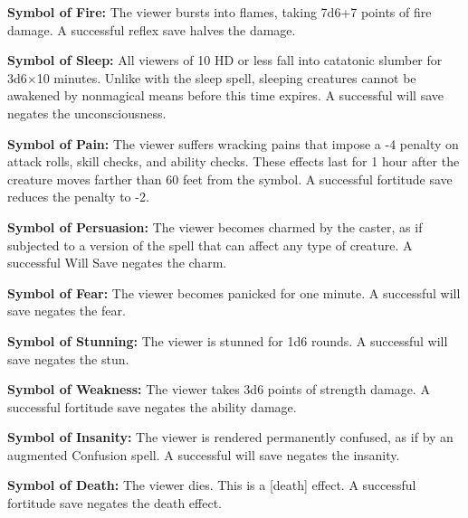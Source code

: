 \begin{list}{}{\leftmargin=1em}
 \item \textbf{Symbol of Fire:} The viewer bursts into flames, taking 7d6+7 points of fire damage.
 A successful reflex save halves the damage.
 \item \textbf{Symbol of Sleep:} All viewers of 10 HD or less fall into catatonic slumber for
 3d6$\times$10 minutes. Unlike with the sleep spell, sleeping creatures cannot be awakened by nonmagical means before this time expires.
 A successful will save negates the unconsciousness.
 \item \textbf{Symbol of Pain:} The viewer suffers wracking pains that impose a -4 penalty on attack rolls, 
 skill checks, and ability checks. These effects last for 1 hour after the creature moves farther than 60 feet from the symbol.
 A successful fortitude save reduces the penalty to -2.
 \item \textbf{Symbol of Persuasion:} The viewer becomes charmed by the caster, as if subjected to a version of the 
 spell that can affect any type of creature.
 A successful Will Save negates the charm.
 \item \textbf{Symbol of Fear:} The viewer becomes panicked for one minute. A successful will save negates the fear.
 \item \textbf{Symbol of Stunning:} The viewer is stunned for 1d6 rounds. A successful will save negates the stun.
 \item \textbf{Symbol of Weakness:} The viewer takes 3d6 points of strength damage. A successful fortitude save negates the ability damage.
 \item \textbf{Symbol of Insanity:} The viewer is rendered permanently confused, as if by an augmented Confusion spell. A successful will save negates the insanity.
 \item \textbf{Symbol of Death:} The viewer dies. This is a [death] effect. A successful fortitude save negates the death effect.
\end{list}

